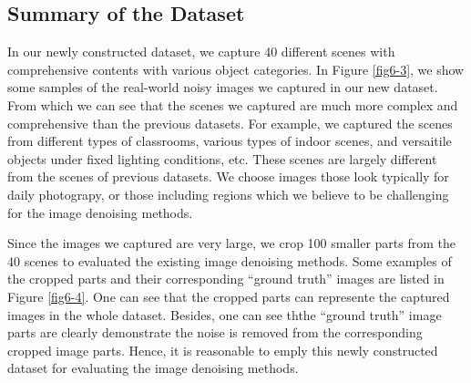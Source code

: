 \subsection{Summary of the Dataset}

In our newly constructed dataset, we capture 40 different scenes with comprehensive contents with various object categories. In Figure \ref{fig6-3}, we show some samples of the real-world noisy images we captured in our new dataset. From which we can see that the scenes we captured are much more complex and comprehensive than the previous datasets. For example, we captured the scenes from different types of classrooms, various types of indoor scenes, and versaitile objects under fixed lighting conditions, etc. These scenes are largely different from the scenes of previous datasets. We choose images those look typically for daily photograpy, or those including regions which we believe to be challenging for the image denoising methods. 

Since the images we captured are very large, we crop 100 smaller parts from the 40 scenes to evaluated the existing image denoising methods. Some examples of the cropped parts and their corresponding ``ground truth'' images are listed in Figure \ref{fig6-4}. One can see that the cropped parts can represente the captured images in the whole dataset. Besides, one can see ththe ``ground truth'' image parts are clearly demonstrate the noise is removed from the corresponding cropped image parts. Hence, it is reasonable to emply this newly constructed dataset for evaluating the image denoising methods. 

